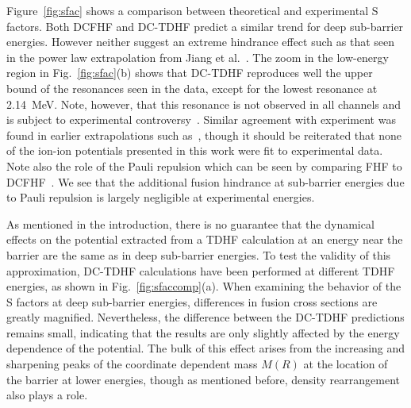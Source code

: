 Figure~\ref{fig:sfac} shows a comparison between theoretical and experimental S factors. 
Both DCFHF and DC-TDHF predict a similar trend for deep sub-barrier energies.
However neither suggest an extreme hindrance effect such as that seen in the power law extrapolation from Jiang et al.~\protect\citep{jiang2007}.
The zoom in the low-energy region in Fig.~\ref{fig:sfac}(b) shows that DC-TDHF reproduces well the upper bound of the resonances seen in the data, except for the lowest resonance at 2.14~MeV. 
Note, however, that this resonance is not observed in all channels and is subject to experimental controversy~\protect\citep{tang2018}.
Similar agreement with experiment was found in earlier extrapolations such as~\protect\citep{fowler1975,gasques2005}, though it should be reiterated that none of the ion-ion potentials presented in this work were fit to experimental data.
Note also the role of the Pauli repulsion which can be seen by comparing FHF to DCFHF~\protect\citep{simenel2017}. 
We see that the additional fusion hindrance at sub-barrier energies due to Pauli repulsion is largely negligible at experimental energies.

As mentioned in the introduction, there is no guarantee that the dynamical effects on the potential extracted from a TDHF calculation at an energy near the barrier are the same as in deep sub-barrier energies. 
To test the validity of this approximation,  DC-TDHF calculations have been performed at different TDHF energies, as shown in Fig.~\ref{fig:sfaccomp}(a).
When examining the behavior of the S factors at deep sub-barrier energies, differences in fusion cross sections are greatly magnified.
Nevertheless, the difference between the DC-TDHF predictions remains small, indicating that the results are only slightly affected by the energy dependence of the potential. 
The bulk of this effect arises from the increasing and sharpening peaks of the coordinate dependent mass $M(R)$ at the location of the barrier at lower energies, though as mentioned before, density rearrangement also plays a role. 

